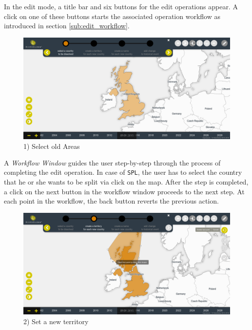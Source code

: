 \begin{landscape}
\begin{minipage}[t]{10cm}
    In the edit mode, a title bar and six buttons for the edit operations appear. A click on one of these buttons starts the associated operation workflow as introduced in section \ref{sub:edit_workflow}.

  \end{minipage}

  \vspace{1em}
  \begin{minipage}[t]{10cm}

    \begin{figure}[H]
      \centering
      \includegraphics[width=1.0\textwidth]{graphics/development/user_interface_design_process/3_select_old_areas.png}
      \caption{1) Select old Areas}
      \label{fig:final_3_select_old_areas}
    \end{figure}

    A \emph{Workflow Window} guides the user step-by-step through the process of completing the edit operation. In case of \texttt{SPL}, the user has to select the country that he or she wants to be split via click on the map. After the step is completed, a click on the next button in the workflow window proceeds to the next step. At each point in the workflow, the back button reverts the previous action.

  \end{minipage}    %
  \hspace{1.5em}    %
  \begin{minipage}[t]{10cm}

    \begin{figure}[H]
      \centering
      \includegraphics[width=1.0\textwidth]{graphics/development/user_interface_design_process/4_set_new_territories.png}
      \caption{2) Set a new territory}
      \label{fig:final_4_set_new_territories}
    \end{figure}


\end{minipage}
\end{landscape}
